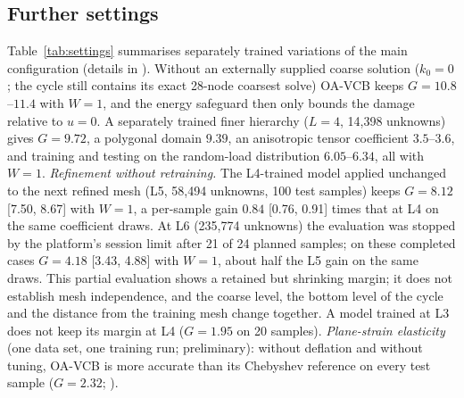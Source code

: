 \subsection{Further settings}\label{sec:k0}\label{sec:l4}\label{sec:aniso}

Table~\ref{tab:settings} summarises separately trained variations of the main configuration (details in
). Without an externally supplied coarse solution ($k_0=0$; the cycle still contains its exact 28-node
coarsest solve) OA-VCB keeps $G = 10.8$--$11.4$ with $W = 1$, and the energy safeguard then only bounds the damage relative to
$u=0$. A separately trained finer hierarchy ($L=4$, 14{,}398 unknowns) gives $G = 9.72$, a polygonal domain $9.39$, an anisotropic
tensor coefficient $3.5$--$3.6$, and training and testing on the random-load distribution $6.05$--$6.34$, all with $W=1$.
\emph{Refinement without retraining.} The L4-trained model applied unchanged to the next refined mesh (L5, 58{,}494 unknowns,
100 test samples) keeps $G = 8.12$ [7.50, 8.67] with $W = 1$, a per-sample gain $0.84$ [0.76, 0.91] times that at L4 on the same
coefficient draws. At L6 (235{,}774 unknowns) the evaluation was stopped by the platform's session limit after 21 of 24 planned
samples; on these completed cases $G = 4.18$ [3.43, 4.88] with $W = 1$, about half the L5 gain on the same draws. This partial
evaluation shows a retained but shrinking margin; it does not establish mesh independence, and the coarse level, the bottom
level of the cycle and the distance from the training mesh change together. A model trained at L3 does not keep its margin at
L4 ($G = 1.95$ on 20 samples). \emph{Plane-strain elasticity} (one data set, one training run; preliminary): without deflation and without
tuning, OA-VCB is more accurate than its Chebyshev reference on every test sample ($G = 2.32$; ).
